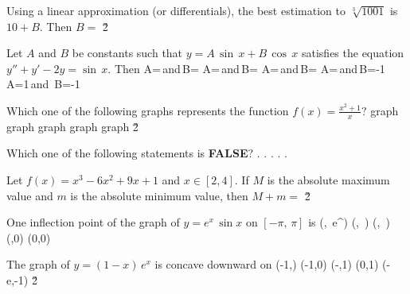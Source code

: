 \documentclass[amsfonts,bezier,leqno,fleqn,12pt,a4paper]{article}
\begin{document}
\begin{large}
\item %
Using a linear approximation (or differentials), the best estimation to $\sqrt[3]{1001}$ is $10+B.$ Then $B=$
\sc
\be
\displaystyle {}
\ee
\be
\displaystyle {}
\ee
\be
\displaystyle {}
\ee
\be
\displaystyle {}
\ee
\be
\displaystyle {}
\ee
\v2



\item %
Let $A$ and $B$ be constants such that $y=A\,\sin\,x+B\,\cos\,x$ satisfies the equation $y''+y'-2y=\sin\,x$. Then
\sc
\be
\displaystyle A=\,\mbox{and}\,B=
\ee
\be
\displaystyle A=\,\mbox{and}\,B=
\ee
\be
\displaystyle A=\,\mbox{and}\,B=
\ee
\be
\displaystyle A=\,\mbox{and}\,B=-1
\ee
\be
A=1\,\mbox{and}\, B=-1
\ee
\newpage



\item %
Which one of the following graphs represents the function $\displaystyle f(x)=\frac{x^{2}+1}{x}?$
\sc
\be
\mbox{graph}
\ee
\be
\mbox{graph}
\ee
\be
\mbox{graph}
\ee
\be
\mbox{graph}
\ee
\be
\mbox{graph}
\ee
\v2



\item %
Which one of the following statements is \textbf{FALSE}?
\sc
\be
.
\ee
\be
.
\ee
\be
.
\ee
\be
.
\ee
\be
.
\ee
\newpage



\item %
Let $f(x)=x^3-6x^2+9x+1$ and $x\in[2,4].$ If $M$ is the absolute maximum value and $m$ is the absolute minimum value, then $M+m=$
\sc
{}
\ee
{}
\ee
{}
\ee
{}
\ee
{}
\ee
\v2



\item %
One inflection point of the graph of $y=e^x\,\sin x$ on $[-\pi,\,\pi]$ is
\sc
\be
\displaystyle \left(,\, e^{}\right)
\ee
\be
\displaystyle \left(,\, \right)
\ee
\be
\displaystyle \left(,\, \right)
\ee
\be
(\pi,0)
\ee
\be
(0,0)
\ee
\newpage



\item %
The graph of $y=(1-x)\,e^x$ is concave downward on
\sc
\be
\displaystyle (-1,\infty)
\ee
\be
(-1,0)
\ee
\be
(-\infty,1)
\ee
\be
(0,1)
\ee
\be
(-e,-1)
\ee
\v2




\end{large}
\end{document}
